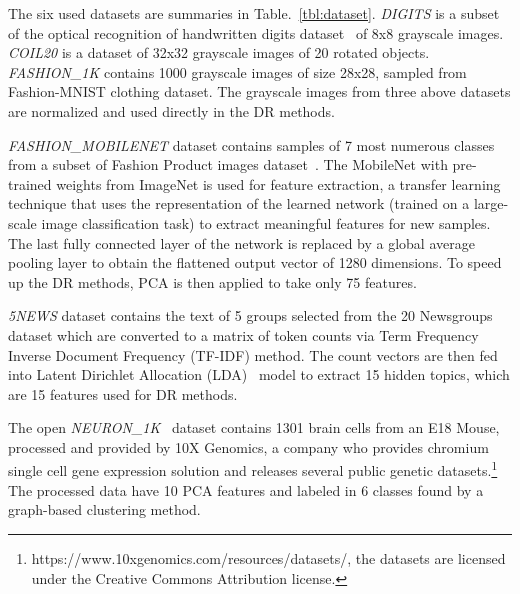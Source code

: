 The six used datasets are summaries in Table.~\ref{tbl:dataset}.
\emph{DIGITS} is a subset of the optical recognition of handwritten digits dataset~\cite{kaynak1995methods} of 8x8 grayscale images.
\emph{COIL20} \cite{nene1996} is a dataset of 32x32 grayscale images of 20 rotated objects.
\emph{FASHION\_1K} contains 1000 grayscale images of size 28x28, sampled from Fashion-MNIST\cite{xiao2017/online} clothing dataset.
The grayscale images from three above datasets are normalized and used directly in the DR methods.

\emph{FASHION\_MOBILENET} dataset contains samples of 7 most numerous classes from a subset of Fashion Product images dataset~\cite{fashionproduct}.
The MobileNet\cite{howard2017mobilenets} with pre-trained weights from ImageNet is used for feature extraction, a transfer learning technique that uses the representation of the learned network (trained on a large-scale image classification task) to extract meaningful features for new samples.
The last fully connected layer of the network is replaced by a global average pooling layer\cite[Sec.3.2]{lin2013network} to obtain the flattened output vector of 1280 dimensions.
To speed up the DR methods, PCA is then applied to take only 75 features.

\emph{5NEWS} dataset contains the text of 5 groups selected from the 20 Newsgroups dataset which are converted to a matrix of token counts via Term Frequency Inverse Document Frequency (TF-IDF) method.
The count vectors are then fed into Latent Dirichlet Allocation (LDA)~\cite{blei2003latent} model to extract 15 hidden topics, which are 15 features used for DR methods.

The open \emph{NEURON\_1K}~\cite{neuron1k} dataset contains 1301 brain cells from an E18 Mouse, processed and provided by 10X Genomics, a company who provides chromium single cell gene expression solution and releases several public genetic datasets.\footnote{https://www.10xgenomics.com/resources/datasets/, the datasets are licensed under the Creative Commons Attribution license.}
The processed data have 10 PCA features and labeled in 6 classes found by a graph-based clustering method.



